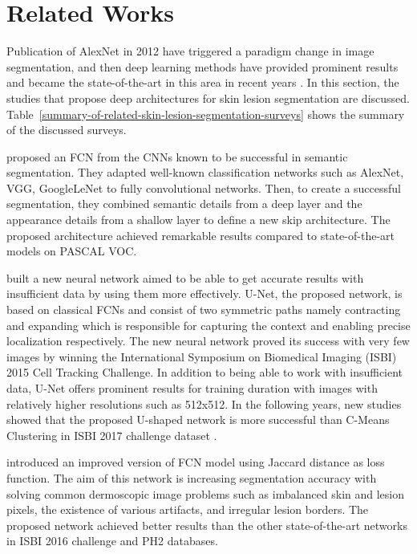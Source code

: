 \section{Related Works}

    Publication of AlexNet in 2012 have triggered a paradigm change in image segmentation, and then
    deep learning methods have provided prominent results and became the state-of-the-art in this area in recent years \cite{quang2017automatic}.
    In this section, the studies that propose deep architectures for skin lesion segmentation are discussed.
    Table~\ref{summary-of-related-skin-lesion-segmentation-surveys} shows the summary of the discussed surveys.

    \citet{long2015fully} proposed an FCN from the CNNs known to be successful in semantic segmentation.
    They adapted well-known classification networks such as AlexNet, VGG, GoogleLeNet to fully convolutional networks.
    Then, to create a successful segmentation, they combined semantic details from a deep layer
    and the appearance details from a shallow layer to define a new skip architecture.
    The proposed architecture achieved remarkable results compared to state-of-the-art models on PASCAL VOC.

    \citet{ronneberger2015u} built a new neural network aimed to be able to get accurate results with insufficient data by using them more effectively.
    U-Net, the proposed network, is based on classical FCNs and consist of two symmetric paths
    namely contracting and expanding which is responsible for capturing the context and enabling precise localization respectively.
    The new neural network proved its success with very few images by  winning the International Symposium on Biomedical Imaging (ISBI) 2015 Cell Tracking Challenge.
    In addition to being able to work with insufficient data, U-Net offers prominent results for training duration with images with relatively higher resolutions such as 512x512.
    In the following years, new studies showed that the proposed U-shaped network is more successful than C-Means Clustering in ISBI 2017 challenge dataset \cite{lin2017skin}.

    \citet{yuan2017automatic} introduced an improved version of FCN model using Jaccard distance as loss function.
    The aim of this network is increasing segmentation accuracy with
    solving common dermoscopic image problems such as imbalanced skin and lesion pixels, the existence of various artifacts, and irregular lesion borders.
    The proposed network achieved better results than the other state-of-the-art networks in ISBI 2016 challenge and PH2 databases.

